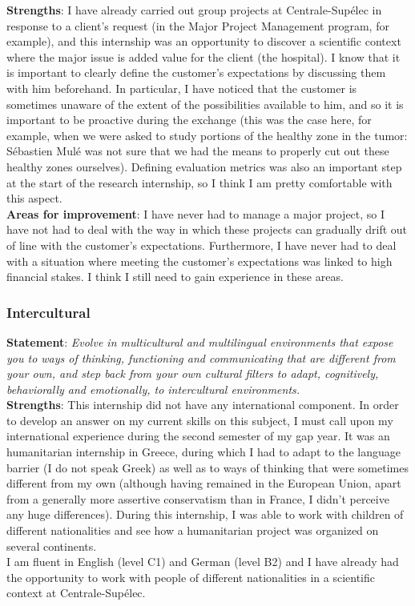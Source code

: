 \documentclass[preprint,12pt]{elsarticle}
\begin{document}
\noindent \textbf{Strengths}: I have already carried out group projects at Centrale-Supélec in response to a client's request (in the Major Project Management program, for example), and this internship was an opportunity to discover a scientific context where the major issue is added value for the client (the hospital). I know that it is important to clearly define the customer's expectations by discussing them with him beforehand. In particular, I have noticed that the customer is sometimes unaware of the extent of the possibilities available to him, and so it is important to be proactive during the exchange (this was the case here, for example, when we were asked to study portions of the healthy zone in the tumor: Sébastien Mulé was not sure that we had the means to properly cut out these healthy zones ourselves). Defining evaluation metrics was also an important step at the start of the research internship, so I think I am pretty comfortable with this aspect.\\[3 pt]

\noindent \textbf{Areas for improvement}: I have never had to manage a major project, so I have not had to deal with the way in which these projects can gradually drift out of line with the customer's expectations. Furthermore, I have never had to deal with a situation where meeting the customer's expectations was linked to high financial stakes. I think I still need to gain experience in these areas.

\subsubsection{Intercultural}

\noindent \textbf{Statement}: \textit{ Evolve in multicultural and multilingual environments that expose you to ways of thinking, functioning and communicating that are different from your own, and step back from your own cultural filters to adapt, cognitively, behaviorally and emotionally, to intercultural environments.}\\[3 pt]

\noindent \textbf{Strengths}: This internship did not have any international component. In order to develop an answer on my current skills on this subject, I must call upon my international experience during the second semester of my gap year. It was an humanitarian internship in Greece, during which I had to adapt to the language barrier (I do not speak Greek) as well as to ways of thinking that were sometimes different from my own (although having remained in the European Union, apart from a generally more assertive conservatism than in France, I didn't perceive any huge differences). During this internship, I was able to work with children of different nationalities and see how a humanitarian project was organized on several continents.\\
\indent I am fluent in English (level C1) and German (level B2) and I have already had the opportunity to work with people of different nationalities in a scientific context at Centrale-Supélec.\\[3 pt] 
\end{document}

